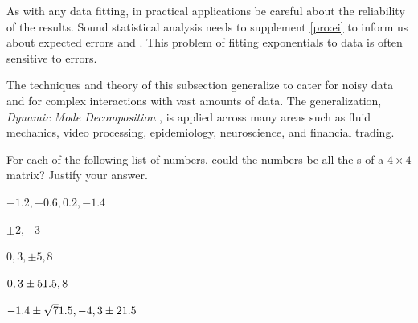 \begin{reduce}
As with any data fitting, in practical applications be careful about the reliability of the results.
Sound statistical analysis needs to supplement \autoref{pro:ei} to inform us about expected errors and .
This problem of fitting exponentials to data is often sensitive to errors.

The techniques and theory of this subsection generalize to cater for noisy data and for complex  interactions with vast amounts of data.
The generalization, \emph{Dynamic Mode Decomposition} \cite[e.g.]{Kutz2016}, is applied across many areas such as fluid mechanics, video processing, epidemiology, neuroscience, and financial trading.




\end{reduce}







\sectionExercises





\begin{exercise}  
For each of the following list of numbers, could the numbers be all the s of a \(4\times4\) matrix? 
Justify your answer.
\begin{Parts}
\item \(-1.2,-0.6,0.2,-1.4\)

\item \(\pm2,-3\)

\item \(0,3,\pm5,8\)

\item \(0,3\pm51.5,8\)

\begin{reduce}
\item \(-1.4\pm\sqrt71.5,-4,3\pm21.5\)
\end{reduce}

\end{Parts}
\end{exercise}






